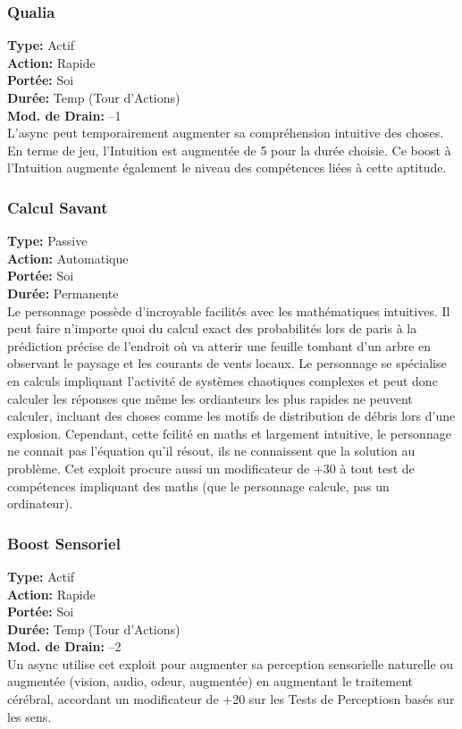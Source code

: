 \subsubsection{Qualia} \textbf{Type:} Actif \\ \textbf{Action:} Rapide \\ \textbf{Portée:} Soi \\ \textbf{Durée:} Temp (Tour d'Actions) \\ \textbf{Mod. de Drain:} –1 \\ L'async peut temporairement augmenter sa compréhension intuitive des choses. En terme de jeu, l'Intuition est augmentée de 5 pour la durée choisie. Ce boost à l'Intuition augmente également le niveau des compétences liées à cette aptitude. 

\subsubsection{Calcul Savant} \textbf{Type:} Passive \\ \textbf{Action:} Automatique \\ \textbf{Portée:} Soi \\ \textbf{Durée:} Permanente \\ Le personnage possède d'incroyable facilités avec les mathématiques intuitives. Il peut faire n'importe quoi du calcul exact des probabilités lors de paris à la prédiction précise de l'endroit où va atterir une feuille tombant d'un arbre en observant le paysage et les courants de vents locaux. Le personnage se spécialise en calculs impliquant l'activité de systèmes chaotiques complexes et peut donc calculer les réponses que même les ordianteurs les plus rapides ne peuvent calculer, incluant des choses comme les motifs de distribution de débris lors d'une explosion. Cependant, cette fcilité en maths et largement intuitive, le personnage ne connait pas l'équation qu'il résout, ils ne connaissent que la solution au problème. Cet exploit procure aussi un modificateur de +30 à tout test de compétences impliquant des maths (que le personnage calcule, pas un ordinateur). 

\subsubsection{Boost Sensoriel} \textbf{Type:} Actif \\ \textbf{Action:} Rapide \\ \textbf{Portée:} Soi \\ \textbf{Durée:} Temp (Tour d'Actions) \\ \textbf{Mod. de Drain:} –2 \\ Un async utilise cet exploit pour augmenter sa perception sensorielle naturelle ou augmentée (vision, audio, odeur, augmentée) en augmentant le traitement cérébral, accordant un modificateur de +20 sur les Tests de Perceptiosn basés sur les sens. 


